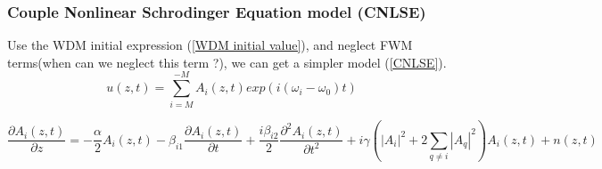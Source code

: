 \subsubsection{Couple Nonlinear Schrodinger Equation model (CNLSE)}
Use the WDM initial expression (\ref{WDM initial value}), and neglect FWM terms(when can we neglect this term ?), we can get a simpler model (\ref{CNLSE}).
\begin{equation}\label{WDM initial value}
u(z,t) = \sum_{i=M}^{-M} A_i(z,t) exp(i (\omega_i - \omega_0) t)
\end{equation}

\begin{equation}\label{CNLSE}
\frac{\partial A_i(z, t)}{\partial z}=-\frac{\alpha}{2}A_i(z,t)-\beta_{i1}\frac{\partial A_i(z,t)}{\partial t} + \frac{i\beta_{i2}}{2} \frac{\partial^2 A_i(z,t)}{\partial t^2} + i \gamma \left(|A_i|^{2} + 2\sum_{q\neq i} |A_q|^2\right) A_i(z, t) + n(z,t)
\end{equation}

